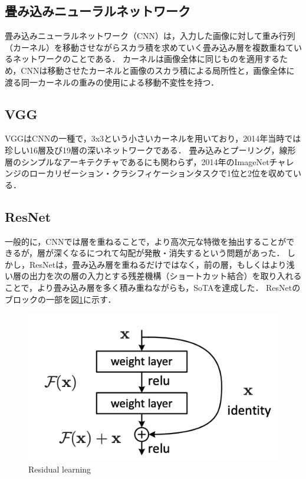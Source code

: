 \documentclass[a4paper, oneside, openany, dvipdfmx]{suribt}%
\newcommand{\fref}[1]{図\ref{#1}}
\begin{document}
\subsection{畳み込みニューラルネットワーク}
畳み込みニューラルネットワーク（CNN）は，入力した画像に対して重み行列（カーネル）を移動させながらスカラ積を求めていく畳み込み層を複数重ねているネットワークのことである．
カーネルは画像全体に同じものを適用するため，CNNは移動させたカーネルと画像のスカラ積による局所性と，画像全体に渡る同一カーネルの重みの使用による移動不変性を持つ．
\subsection{VGG\cite{simonyan2015deep}}
VGGはCNNの一種で，3x3という小さいカーネルを用いており，2014年当時では珍しい16層及び19層の深いネットワークである．
畳み込みとプーリング，線形層のシンプルなアーキテクチャであるにも関わらず，2014年のImageNetチャレンジのローカリゼーション・クラシフィケーションタスクで1位と2位を収めている．

\subsection{ResNet\cite{he2015deep}}
一般的に，CNNでは層を重ねることで，より高次元な特徴を抽出することができるが，層が深くなるにつれて勾配が発散・消失するという問題があった．
しかし，ResNetは，畳み込み層を重ねるだけではなく，前の層，もしくはより浅い層の出力を次の層の入力とする残差機構（ショートカット結合）を取り入れることで，より畳み込み層を多く積み重ねながらも，SoTAを達成した．
ResNetのブロックの一部を\fref{fig:res_arch}に示す．
\begin{figure}[h]
  \centering
  \includegraphics[width=0.9\linewidth]{figs/resnet.png}
  \caption{Residual learning}
  \label{fig:res_arch}
\end{figure}
\end{document}
